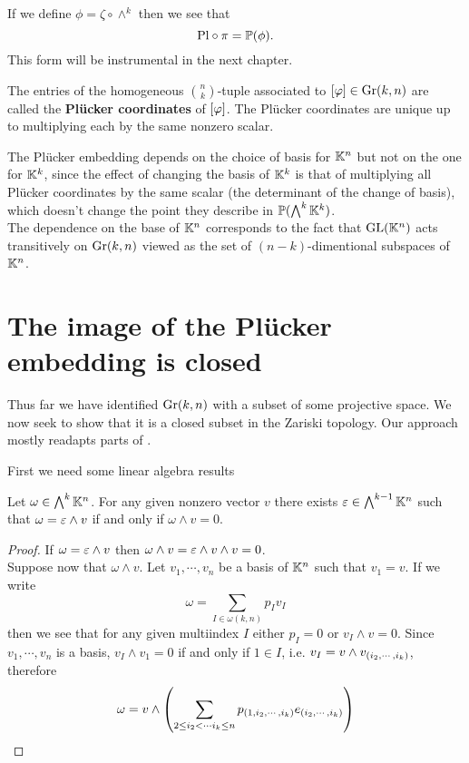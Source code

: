 \begin{remark}
If we define $\phi=\zeta\circ \wedge^k$ then we see that \[\mathrm{Pl}\circ \pi=\mathbb{P}(\phi).\]
This form will be instrumental in the next chapter.
\end{remark}

\noindent
The entries of the homogeneous $\binom nk$-tuple associated to $[\varphi]\in \mathrm{Gr}(k,n)$ are called the \textbf{Pl\"ucker coordinates} of $[\varphi]$. The Pl\"ucker coordinates are unique up to multiplying each by the same nonzero scalar.

\begin{remark}
The Pl\"ucker embedding depends on the choice of basis for $\mathbb{K}^n$ but not on the one for $\mathbb{K}^k$, since the effect of changing the basis of $\mathbb{K}^k$ is that of multiplying all Pl\"ucker coordinates by the same scalar (the determinant of the change of basis), which doesn't change the point they describe in $\mathbb{P}(\bigwedge^k\mathbb{K}^k)$.\\
The dependence on the base of $\mathbb{K}^n$ corresponds to the fact that $\mathrm{GL}(\mathbb{K}^n)$ acts transitively on $\mathrm{Gr}(k,n)$ viewed as the set of $(n-k)$-dimentional subspaces of $\mathbb{K}^n$.
\end{remark}



\section{The image of the Pl\"ucker embedding is closed}
Thus far we have identified $\mathrm{Gr}(k,n)$ with a subset of some projective space. We now seek to show that it is a closed subset in the Zariski topology. Our approach mostly readapts parts of \cite{McKernan}.
\medskip

\noindent First we need some linear algebra results

\begin{lemma}\label{Divisibility}
Let $\omega\in \bigwedge^k\mathbb{K}^n$. For any given nonzero vector $v$ there exists $\varepsilon\in \bigwedge^{k-1}\mathbb{K}^n$ such that $\omega=\varepsilon\wedge v$ if and only if $\omega\wedge v=0$.
\end{lemma}
\begin{proof}
If $\omega=\varepsilon\wedge v$ then $\omega\wedge v=\varepsilon\wedge v\wedge v=0$.\\
Suppose now that $\omega\wedge v$. Let $v_1,\cdots, v_n$ be a basis of $\mathbb{K}^n$ such that $v_1=v$. If we write
\[\omega=\sum_{I\in\omega(k,n)}p_I v_I\]
then we see that for any given multiindex $I$ either $p_I=0$ or $v_I\wedge v=0$. Since $v_1,\cdots, v_n$ is a basis, $v_I\wedge v_1=0$ if and only if $1\in I$, i.e. $v_I=v\wedge v_{\left({i_2,\cdots, i_k}\right)}$, therefore
\[\omega=v\wedge \left({\sum_{2\leq i_2<\cdots i_k\leq n} p_{\left({1,i_2,\cdots, i_k}\right)} e_{\left({i_2,\cdots, i_k}\right)}}\right)\]
\end{proof}

